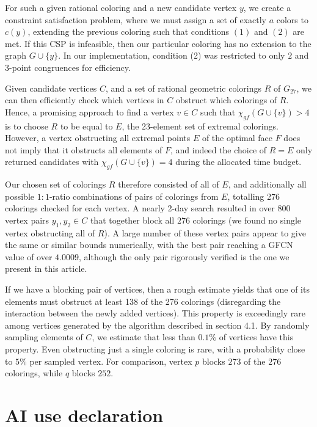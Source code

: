 \documentclass[pdflatex,sn-mathphys-num]{sn-jnl}%
\begin{document}
For such a given rational coloring and a new candidate vertex $y$, we create a constraint satisfaction problem, where we must assign a set of exactly $a$ colors to $c(y)$, extending the previous coloring such that conditions $(1)$ and $(2)$ are met.
If this CSP is infeasible, then our particular coloring has no extension to the graph $G \cup \{y\}$. In our implementation, condition (2) was restricted to only $2$ and $3$-point congruences for efficiency.

Given candidate vertices $C$, and a set of rational geometric colorings $R$ of $G_{27}$, we can then efficiently check which vertices in $C$ obstruct which colorings of $R$. Hence, a promising approach to find a vertex $v \in C$ such that $\chi_{gf}(G \cup \{v\}) > 4$ is to choose $R$ to be equal to $E$, the 23-element set of extremal colorings. However, a vertex obstructing all extremal points $E$ of the optimal face $F$ does not imply that it obstructs all elements of $F$, and indeed the choice of $R=E$ only returned candidates with $\chi_{gf}(G \cup \{v\}) = 4$ during the allocated time budget.


Our chosen set of colorings $R$ therefore consisted of all of $E$, and additionally all possible $1:1$-ratio combinations of pairs of colorings from $E$, totalling 276 colorings checked for each vertex. A nearly 2-day search resulted in over $800$ vertex pairs $y_1, y_2 \in C$ that together block all $276$ colorings (we found no single vertex obstructing all of $R$). A large number of these vertex pairs appear to give the same or similar bounds numerically, with the best pair reaching a GFCN value of over $4.0009$, although the only pair rigorously verified is the one we present in this article.

If we have a blocking pair of vertices, then a rough estimate yields that one of its elements must obstruct at least 138 of the 276 colorings (disregarding the interaction between the newly added vertices). This property is exceedingly rare among vertices generated by the algorithm described in section 4.1. By randomly sampling elements of $C$, we estimate that less than $0.1\%$ of vertices have this property. Even obstructing just a single coloring is rare, with a probability close to $5\%$ per sampled vertex. For comparison, vertex $p$ blocks $273$ of the $276$ colorings, while $q$ blocks $252$.

\section{AI use declaration}
\end{document}
